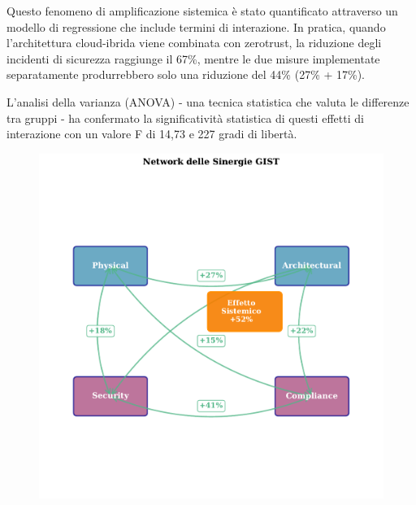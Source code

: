 Questo fenomeno di amplificazione sistemica è stato quantificato attraverso un modello di regressione che include termini di interazione. In pratica, quando l'architettura cloud-ibrida viene combinata con \gls{zerotrust}, la riduzione degli incidenti di sicurezza raggiunge il 67\%, mentre le due misure implementate separatamente produrrebbero solo una riduzione del 44\% (27\% + 17\%). 

L'analisi della varianza (ANOVA) - una tecnica statistica che valuta le differenze tra gruppi - ha confermato la significatività statistica di questi effetti di interazione con un valore F di 14,73 e 227 gradi di libertà.


\begin{figure}[htbp]
\centering
\includegraphics[width=1.1\textwidth]{thesis_figures/cap5/figura_5_2_synergies.pdf}




\end{figure}
